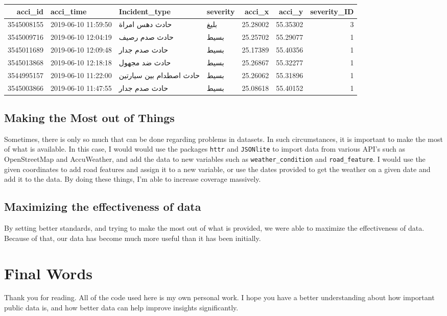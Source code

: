 \documentclass[
]{book}
\begin{document}
\begin{tabular}{r|l|l|l|r|r|r}
\hline
acci\_id & acci\_time & Incident\_type & severity & acci\_x & acci\_y & severity\_ID\\
\hline
3545008155 & 2019-06-10 11:59:50 & حادث دهس امراة & بليغ & 25.28002 & 55.35302 & 3\\
\hline
3545009716 & 2019-06-10 12:04:19 & حادث صدم رصيف & بسيط & 25.25702 & 55.29077 & 1\\
\hline
3545011689 & 2019-06-10 12:09:48 & حادث صدم جدار & بسيط & 25.17389 & 55.40356 & 1\\
\hline
3545013868 & 2019-06-10 12:18:18 & حادث ضد مجهول & بسيط & 25.26867 & 55.32277 & 1\\
\hline
3544995157 & 2019-06-10 11:22:00 & حادث اصطدام بين سيارتين & بسيط & 25.26062 & 55.31896 & 1\\
\hline
3545003866 & 2019-06-10 11:47:55 & حادث صدم جدار & بسيط & 25.08618 & 55.40152 & 1\\
\hline
\end{tabular}

\hypertarget{making-the-most-out-of-things}{%
\section{Making the Most out of Things}\label{making-the-most-out-of-things}}

Sometimes, there is only so much that can be done regarding problems in datasets. In such circumstances, it is important to make the most of what is available. In this case, I would would use the packages \texttt{httr} and \texttt{JSONlite} to import data from various API's such as OpenStreetMap and AccuWeather, and add the data to new variables such as \texttt{weather\_condition} and \texttt{road\_feature}. I would use the given coordinates to add road features and assign it to a new variable, or use the dates provided to get the weather on a given date and add it to the data. By doing these things, I'm able to increase coverage massively.

\hypertarget{maximizing-the-effectiveness-of-data}{%
\section{Maximizing the effectiveness of data}\label{maximizing-the-effectiveness-of-data}}

By setting better standards, and trying to make the most out of what is provided, we were able to maximize the effectiveness of data. Because of that, our data has become much more useful than it has been initially.

\hypertarget{final-words}{%
\chapter{Final Words}\label{final-words}}

Thank you for reading. All of the code used here is my own personal work. I hope you have a better understanding about how important public data is, and how better data can help improve insights significantly.

  
\end{document}
